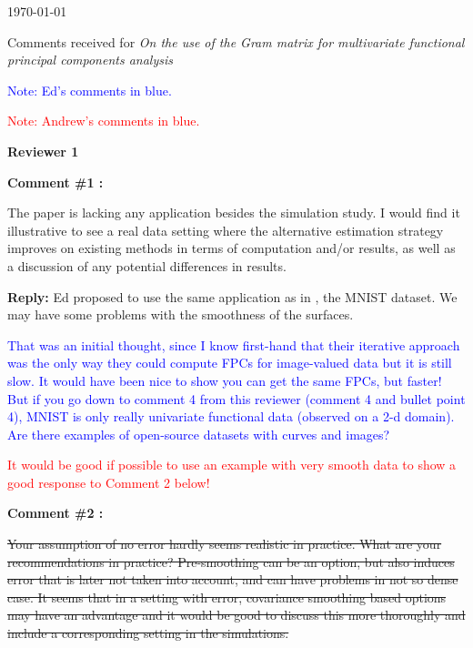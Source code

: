 \documentclass[11pt]{article}
\begin{document}
\newcommand{\thedate}{\today}

\thedate


\begin{center}
{\large Comments received for \emph{On the use of the Gram matrix for multivariate functional principal components analysis}}\\
\end{center} 

\textcolor{blue}{Note: Ed’s comments in blue.}

\textcolor{red}{Note: Andrew’s comments in blue.}

\vspace*{1cm}


{\large \textbf{Reviewer 1} }


\bigskip

\itshape


\textbf{Comment \#1 :}

The paper is lacking any application besides the simulation study. I would find it illustrative to see a real data setting where the alternative estimation strategy improves on existing methods in terms of computation and/or results, as well as a discussion of any potential differences in results.

\medskip

\normalfont

\textbf{Reply:} Ed proposed to use the same application as in \cite{shiTwoDimensionalFunctionalPrincipal2022}, the MNIST dataset. We may have some problems with the smoothness of the surfaces.

\textcolor{blue}{That was an initial thought, since I know first-hand that their iterative approach was the only way they could compute FPCs for image-valued data but it is still slow. It would have been nice to show you can get the same FPCs, but faster! But if you go down to comment 4 from this reviewer (comment 4 and bullet point 4), MNIST is only really univariate functional data (observed on a 2-d domain). Are there examples of open-source datasets with curves and images?}

\textcolor{red}{It would be good if possible to use an example with very smooth data to show a good response to Comment 2 below!}

\bigskip

\itshape

\textbf{Comment \#2 :}

\sout{Your assumption of no error hardly seems realistic in practice. What are your recommendations in practice? Pre-smoothing can be an option, but also induces error that is later not taken into account, and can have problems in not so dense case. It seems that in a setting with error, covariance smoothing based options may have an advantage and it would be good to discuss this more thoroughly and include a corresponding setting in the simulations.}
\end{document}
